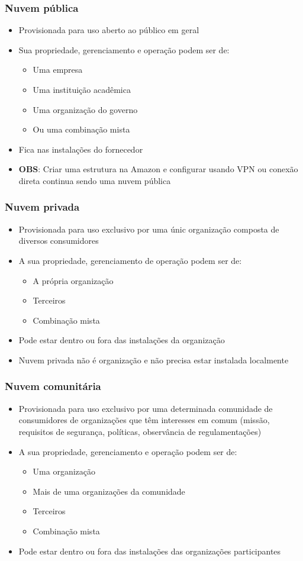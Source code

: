 \begin{frame}
	\frametitle{Nuvem pública}
	\begin{itemize}
		\item Provisionada para uso aberto ao público em geral
		\item Sua propriedade, gerenciamento e operação podem ser de:
			\begin{itemize}
				\item Uma empresa
				\item Uma instituição acadêmica
				\item Uma organização do governo
				\item Ou uma combinação mista
			\end{itemize}
		\item Fica nas instalações do fornecedor
	\item \textbf{OBS}: Criar uma estrutura na Amazon e configurar usando VPN ou conexão direta continua sendo uma nuvem pública
	\end{itemize}
\end{frame}

\begin{frame}
	\frametitle{Nuvem privada}
	\begin{itemize}
		\item Provisionada para uso exclusivo por uma únic organização composta de diversos consumidores
		\item A sua propriedade, gerenciamento de operação podem ser de:
			\begin{itemize}
				\item A própria organização
				\item Terceiros
				\item Combinação mista
			\end{itemize}
		\item Pode estar dentro ou fora das instalações da organização
		\item Nuvem privada não é organização e não precisa estar instalada localmente
	\end{itemize}
\end{frame}

\begin{frame}
	\frametitle{Nuvem comunitária}
	\begin{itemize}
		\item Provisionada para uso exclusivo por uma determinada comunidade de consumidores de organizações que têm interesses em comum (missão, requisitos de segurança, políticas, observância de regulamentações)
		\item A sua propriedade, gerenciamento e operação podem ser de:
			\begin{itemize}
				\item Uma organização
				\item Mais de uma organizações da comunidade
				\item Terceiros
				\item Combinação mista
			\end{itemize}
		\item Pode estar dentro ou fora das instalações das organizações participantes
	\end{itemize}
\end{frame}


